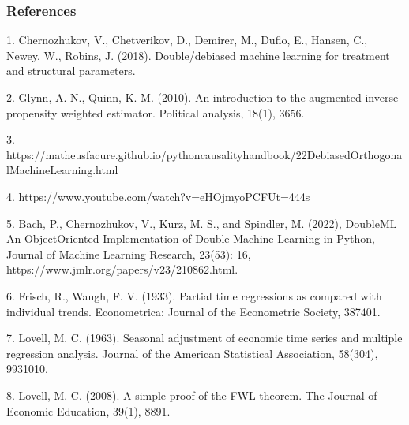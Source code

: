 \documentclass[letterpaper,10pt,english]{jupyterBook}
\begin{document}
\subsection{References}
\label{\detokenize{orthogonal_DML:references}}
\begin{sphinxVerbatim}[commandchars=\\\{\}]
1. Chernozhukov, V., Chetverikov, D., Demirer, M., Duflo, E., Hansen, C., Newey, W., \PYGZam{} Robins, J. (2018). Double/debiased machine learning for treatment and structural parameters.

2. Glynn, A. N., \PYGZam{} Quinn, K. M. (2010). An introduction to the augmented inverse propensity weighted estimator. Political analysis, 18(1), 36\PYGZhy{}56.

3. https://matheusfacure.github.io/python\PYGZhy{}causality\PYGZhy{}handbook/22\PYGZhy{}Debiased\PYGZhy{}Orthogonal\PYGZhy{}Machine\PYGZhy{}Learning.html

4. https://www.youtube.com/watch?v=eHOjmyoPCFU\PYGZam{}t=444s

5. Bach, P., Chernozhukov, V., Kurz, M. S., and Spindler, M. (2022), DoubleML \PYGZhy{} An Object\PYGZhy{}Oriented Implementation of Double Machine Learning in Python, Journal of Machine Learning Research, 23(53): 1\PYGZhy{}6, https://www.jmlr.org/papers/v23/21\PYGZhy{}0862.html.

6. Frisch, R., \PYGZam{} Waugh, F. V. (1933). Partial time regressions as compared with individual trends. Econometrica: Journal of the Econometric Society, 387\PYGZhy{}401.

7. Lovell, M. C. (1963). Seasonal adjustment of economic time series and multiple regression analysis. Journal of the American Statistical Association, 58(304), 993\PYGZhy{}1010.

8. Lovell, M. C. (2008). A simple proof of the FWL theorem. The Journal of Economic Education, 39(1), 88\PYGZhy{}91.
\end{sphinxVerbatim}

\sphinxstepscope


\chapter{}
\label{\detokenize{Conclusion:conclusion-and-new-directions}}\label{\detokenize{Conclusion::doc}}
\end{document}
